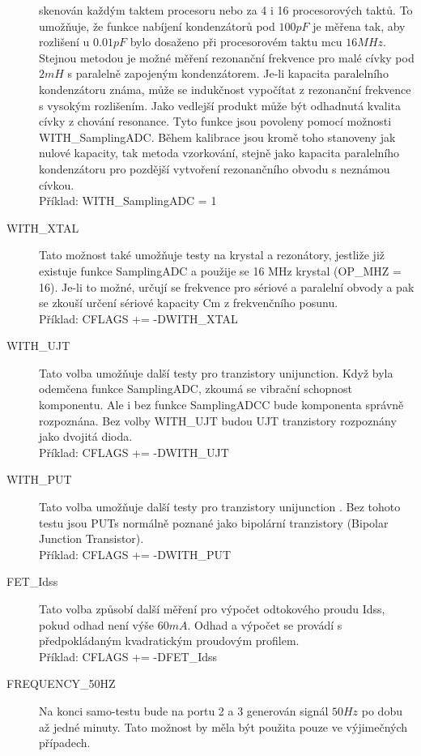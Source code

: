\begin{description}
skenován každým taktem procesoru nebo za 4 i 16 procesorových taktů.
To umožňuje, že funkce nabíjení kondenzátorů pod \(100pF\) je měřena tak,
aby rozlišení u \(0.01pF\) bylo dosaženo při procesorovém taktu mcu \(16MHz\).
Stejnou metodou je možné měření rezonanční frekvence pro malé cívky pod \(2mH\) s paralelně
zapojeným kondenzátorem.
Je-li kapacita paralelního kondenzátoru známa, může se indukčnost vypočítat z rezonanční
frekvence s vysokým rozlišením.
Jako vedlejší produkt může být odhadnutá kvalita cívky z chování resonance.
Tyto funkce jsou povoleny pomocí možnosti WITH\_SamplingADC.
Během kalibrace jsou kromě toho stanoveny jak nulové kapacity, tak metoda vzorkování,
stejně jako kapacita paralelního kondenzátoru pro pozdější vytvoření rezonančního obvodu s neznámou cívkou.\\
Příklad: WITH\_SamplingADC = 1
  \item[WITH\_XTAL]
Tato možnost také umožňuje testy na krystal a rezonátory, jestliže již existuje funkce SamplingADC
a použije se 16 MHz krystal (OP\_MHZ = 16).
Je-li to možné, určují se frekvence pro sériové a paralelní obvody a pak se zkouší
určení sériové kapacity Cm z frekvenčního posunu.\\
Příklad: CFLAGS += -DWITH\_XTAL
  \item[WITH\_UJT]
Tato volba umožňuje další testy pro tranzistory unijunction.
Když byla odemčena funkce SamplingADC, zkoumá se vibrační schopnost komponentu.
Ale i bez funkce SamplingADCC bude komponenta správně rozpoznána.
Bez volby WITH\_UJT budou UJT tranzistory rozpoznány jako dvojitá dioda.\\
Příklad: CFLAGS += -DWITH\_UJT
  \item[WITH\_PUT]
	  Tato volba umožňuje další testy pro tranzistory unijunction .
Bez tohoto testu jsou PUTs normálně poznané jako bipolární tranzistory (Bipolar Junction Transistor).\\
Příklad: CFLAGS += -DWITH\_PUT
 \item[FET\_Idss]
Tato volba způsobí další měření pro výpočet odtokového proudu Idss, pokud odhad není
výše \(60mA\). Odhad a výpočet se provádí s předpokládaným kvadratickým proudovým profilem.\\
Příklad: CFLAGS += -DFET\_Idss
  \item[FREQUENCY\_50HZ] Na konci samo-testu bude na portu 2 a 3 generován signál \(50Hz\) po
dobu až jedné minuty.
Tato možnost by měla být použita pouze ve výjimečných případech.\\

\end{description}
